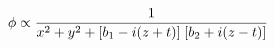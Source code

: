 \begin{equation}
\phi \propto {1\over x^2+y^2+[b_1-i(z+t)]\;[b_2+i(z-t)]}
\label{E:noncovariant}
\end{equation}

